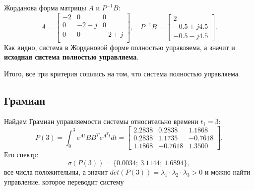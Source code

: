 Жорданова форма матрицы $A$ и $P^{-1}B$:
\begin{equation*}
    A =\begin{bmatrix}
        
-2&	   0&	   0\\
0&	-2-j&	   0\\
0&	   0&	-2+j\\

    \end{bmatrix},\quad
    P^{-1}B=\begin{bmatrix}
        2 \\ -0.5+j4.5 \\ -0.5-j4.5
    \end{bmatrix}.
\end{equation*}
Как видно, система в Жордановой форме полностью управляема, а значит и \textbf{исходная система
полностью управляема}.

Итого, все три критерия сошлись на том, что система полностью управляема.

\subsection{Грамиан}

Найдем Грамиан управляемости системы относительно времени $t_1=3$:
\begin{equation*}
    P(3)=\int_{0}^{3}e^{At}BB^Te^{A^Tt}dt=
    \begin{bmatrix}
        2.2838  &  0.2838  &  1.1868 \\
        0.2838   & 1.1735  & -0.7618 \\
        1.1868  & -0.7618  &  1.3500
    \end{bmatrix}.
\end{equation*}
Его спектр:
\begin{equation*}
    \sigma(P(3))=\{ 0.0034;\ 
    3.1144;\ 
    1.6894\},
\end{equation*}
все числа положительны, а значит $det(P(3))=\lambda_1\cdot\lambda_2\cdot\lambda_3>0$ и
можно найти управление, которое переводит систему